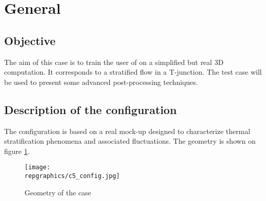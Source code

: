 %
%
%
%
%
%
%
\section{General}

        \subsection{Objective}

The aim of this case is to train the user of \CS on a simplified but real 3D
computation. It corresponds to a stratified flow in a T-junction. The test case
will be used to present some advanced post-processing techniques.


        \subsection{Description of the configuration}

The configuration is based on a real mock-up designed to characterize thermal
stratification phenomena and associated fluctuations. The geometry is shown on
figure \ref{config}.


\begin{figure}[h!]
\begin{center}
\texttt{[image: \\repgraphics/c5\_config.jpg]}
\caption{Geometry of the case}
\label{config}
\end{center}
\end{figure}

